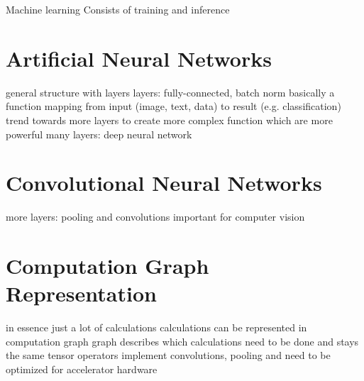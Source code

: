 Machine learning
Consists of training and inference
\section{Artificial Neural Networks}
general structure with layers
layers: fully-connected, batch norm
basically a function mapping from input (image, text, data) to result (e.g. classification)
trend towards more layers to create more complex function which are more powerful
many layers: deep neural network
\section{Convolutional Neural Networks}
more layers: pooling and convolutions
important for computer vision

\section{Computation Graph Representation}
in essence just a lot of calculations
calculations can be represented in computation graph
graph describes which calculations need to be done and stays the same
tensor operators implement convolutions, pooling and need to be optimized for accelerator hardware